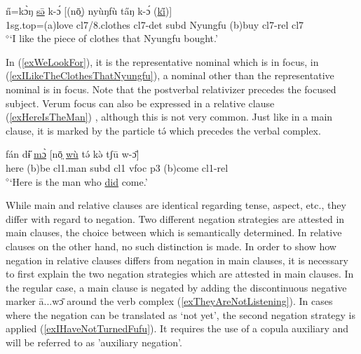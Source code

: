 \documentclass[10pt,twoside]{article}
\def\ci#1{{\ipaFont #1}}
\newcommand{\gl}[1]{`#1'}
\def\VSP{\vspace{0pt}}
\newcommand{\cl}[1]{{\sc cl#1}}
\newcommand{\pref}[1]{(\ref{#1})}
\def\elicited{$^\diamond$}
\begin{document}
\begin{exe}
	\ex \label{exILikeTheClothes}	

		\gll n̋=kɔ̀ŋ \uline{sə̄} k-ɔ́ [(nō̤) nyùŋfù ta̋ŋ k-ɔ́ (\uline{ki̋})]			\\
		{\sc 1sg.top}=({\sc a})love \cl7/8.clothes \cl7-{\sc det} {\sc subd} Nyungfu ({\sc b})buy \cl7-{\sc rel} \cl7 	\\
		\glt \VSP \elicited \gl{I like the piece of clothes that Nyungfu bought.}

\end{exe}%

In \pref{exWeLookFor}, it is the representative nominal which is in focus, in \pref{exILikeTheClothesThatNyungfu}, 
a nominal other than the representative nominal is in focus. Note that the postverbal relativizer precedes 
the focused subject.
Verum focus can also be expressed in a relative clause \pref{exHereIsTheMan} , although this is not very common. Just like in a main clause, it is 
marked by the particle \ci{tə́} which precedes the verbal complex.

\begin{exe}
	\ex \label{exHereIsTheMan}	

		\gll 	fán dɨ̋ \uline{mɔ̀} [nō̤ \uline{wù} tə́ kə̀ tʃū w-ɔ̄]	\\
			here ({\sc b})be \cl1.man {\sc subd} \cl1  {\sc vfoc} {\sc p3} ({\sc b})come \cl1-{\sc rel}\\
		\glt \VSP \elicited \gl{Here is the man who \uline{did} come.}
		
\end{exe}%

While main and relative clauses are identical regarding tense, aspect, etc., they differ with regard to negation. Two different negation strategies are attested in main clauses, the choice between which is semantically determined. In relative clauses on the other hand, no such distinction is made. In order to show how negation in relative clauses differs from negation in main clauses, it is necessary to first explain the two negation strategies which are attested in main clauses.
In the regular case, a main clause is negated by adding the discontinuous negative marker \ci{ā...wɔ̄} 
around the verb complex %
\pref{exTheyAreNotListening}. In cases where the negation can be translated as \gl{not yet}, the second negation strategy is applied \pref{exIHaveNotTurnedFufu}. It requires the use of a copula auxiliary and will be referred to as 'auxiliary negation'.
\end{document}

